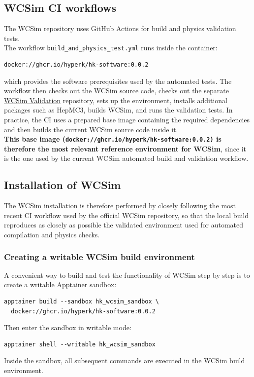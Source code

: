 \documentclass{article}
\numberwithin{table}{subsection}
\numberwithin{figure}{subsection}
\numberwithin{equation}{subsection}
\numberwithin{footnote}{subsection}
\begin{document}
\subsection{WCSim CI workflows}
\label{WCSim_CI}
The WCSim repository uses GitHub Actions for build and physics validation tests.\\
The workflow \texttt{build\_and\_physics\_test.yml} runs inside the container:
\begin{lstlisting}[style=defstyle]
docker://ghcr.io/hyperk/hk-software:0.0.2
\end{lstlisting}
which provides the software prerequisites used by the automated tests. The
workflow then checks out the WCSim source code, checks out the separate
\href{https://github.com/WCSim/Validation}{WCSim Validation} repository, sets up the environment, installs additional packages such as HepMC3, builds WCSim, and runs the validation tests. In practice, the CI uses a
prepared base image containing the required dependencies and then builds the current WCSim source code inside it.\\
\textbf{This base image (\texttt{docker://ghcr.io/hyperk/hk-software:0.0.2)} is therefore the most relevant reference environment for WCSim}, since it is the one used by the current WCSim automated
build and validation workflow.
\subsection{Installation of WCSim}
The WCSim installation is therefore performed by closely following the most recent CI workflow used by the official WCSim repository, so that the local build reproduces as closely as possible the validated environment used for automated compilation and physics checks.
\subsubsection{Creating a writable WCSim build environment}
\label{subsec:wcsim_sandbox}

A convenient way to build and test the functionality of WCSim step by step is to create a writable Apptainer sandbox:
\begin{lstlisting}[style=terminal]
apptainer build --sandbox hk_wcsim_sandbox \
  docker://ghcr.io/hyperk/hk-software:0.0.2
\end{lstlisting}
Then enter the sandbox in writable mode:
\begin{lstlisting}[style=terminal]
apptainer shell --writable hk_wcsim_sandbox
\end{lstlisting}
Inside the sandbox, all subsequent commands are executed in the WCSim build environment.
\end{document}
